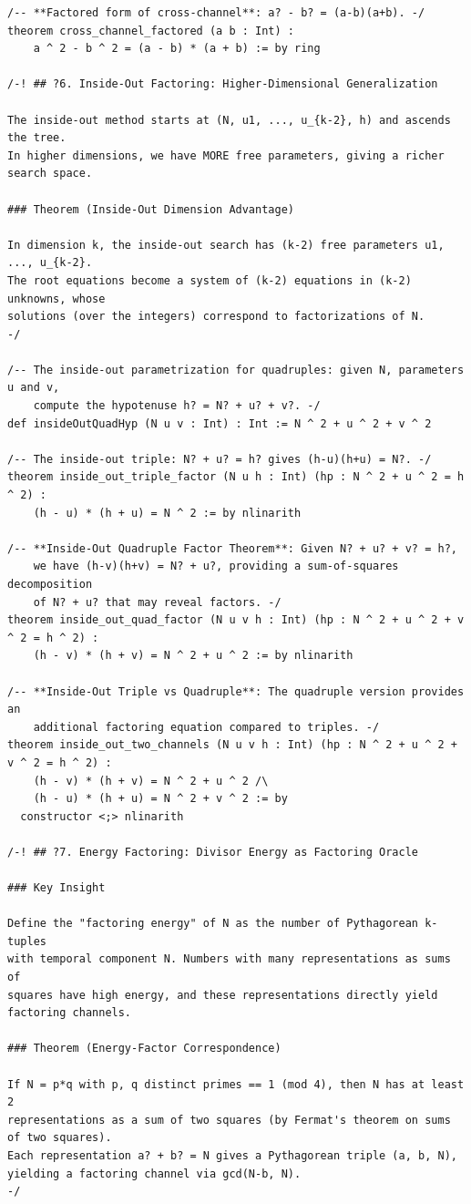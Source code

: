 \documentclass[11pt,twoside,openright]{book}
\theoremstyle{definition}
\theoremstyle{remark}
\begin{document}
\begin{lstlisting}[style=lean]
/-- **Factored form of cross-channel**: a? - b? = (a-b)(a+b). -/
theorem cross_channel_factored (a b : Int) :
    a ^ 2 - b ^ 2 = (a - b) * (a + b) := by ring

/-! ## ?6. Inside-Out Factoring: Higher-Dimensional Generalization

The inside-out method starts at (N, u1, ..., u_{k-2}, h) and ascends the tree.
In higher dimensions, we have MORE free parameters, giving a richer search space.

### Theorem (Inside-Out Dimension Advantage)

In dimension k, the inside-out search has (k-2) free parameters u1, ..., u_{k-2}.
The root equations become a system of (k-2) equations in (k-2) unknowns, whose
solutions (over the integers) correspond to factorizations of N.
-/

/-- The inside-out parametrization for quadruples: given N, parameters u and v,
    compute the hypotenuse h? = N? + u? + v?. -/
def insideOutQuadHyp (N u v : Int) : Int := N ^ 2 + u ^ 2 + v ^ 2

/-- The inside-out triple: N? + u? = h? gives (h-u)(h+u) = N?. -/
theorem inside_out_triple_factor (N u h : Int) (hp : N ^ 2 + u ^ 2 = h ^ 2) :
    (h - u) * (h + u) = N ^ 2 := by nlinarith

/-- **Inside-Out Quadruple Factor Theorem**: Given N? + u? + v? = h?,
    we have (h-v)(h+v) = N? + u?, providing a sum-of-squares decomposition
    of N? + u? that may reveal factors. -/
theorem inside_out_quad_factor (N u v h : Int) (hp : N ^ 2 + u ^ 2 + v ^ 2 = h ^ 2) :
    (h - v) * (h + v) = N ^ 2 + u ^ 2 := by nlinarith

/-- **Inside-Out Triple vs Quadruple**: The quadruple version provides an
    additional factoring equation compared to triples. -/
theorem inside_out_two_channels (N u v h : Int) (hp : N ^ 2 + u ^ 2 + v ^ 2 = h ^ 2) :
    (h - v) * (h + v) = N ^ 2 + u ^ 2 /\
    (h - u) * (h + u) = N ^ 2 + v ^ 2 := by
  constructor <;> nlinarith

/-! ## ?7. Energy Factoring: Divisor Energy as Factoring Oracle

### Key Insight

Define the "factoring energy" of N as the number of Pythagorean k-tuples
with temporal component N. Numbers with many representations as sums of
squares have high energy, and these representations directly yield
factoring channels.

### Theorem (Energy-Factor Correspondence)

If N = p*q with p, q distinct primes == 1 (mod 4), then N has at least 2
representations as a sum of two squares (by Fermat's theorem on sums of two squares).
Each representation a? + b? = N gives a Pythagorean triple (a, b, N),
yielding a factoring channel via gcd(N-b, N).
-/


\end{lstlisting}
\end{document}
